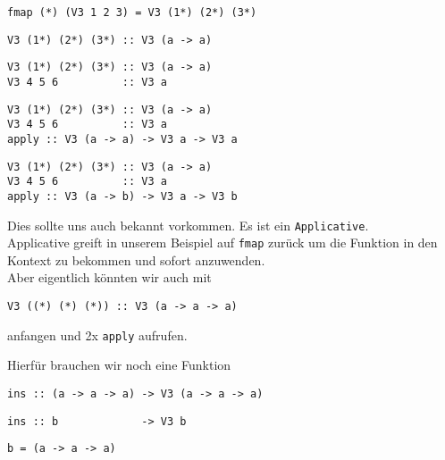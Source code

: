 \documentclass{beamer}
\begin{document}
\begin{frame}[fragile]
\begin{overprint}
\begin{verbatim}
fmap (*) (V3 1 2 3) = V3 (1*) (2*) (3*)
\end{verbatim}
\begin{verbatim}
V3 (1*) (2*) (3*) :: V3 (a -> a)
\end{verbatim}
\begin{verbatim}
V3 (1*) (2*) (3*) :: V3 (a -> a)
V3 4 5 6          :: V3 a
\end{verbatim}
\begin{verbatim}
V3 (1*) (2*) (3*) :: V3 (a -> a)
V3 4 5 6          :: V3 a
apply :: V3 (a -> a) -> V3 a -> V3 a
\end{verbatim}
\begin{verbatim}
V3 (1*) (2*) (3*) :: V3 (a -> a)
V3 4 5 6          :: V3 a
apply :: V3 (a -> b) -> V3 a -> V3 b
\end{verbatim}
\end{overprint}
\pause
\pause
\pause
\pause
\pause
Dies sollte uns auch bekannt vorkommen. \pause Es ist ein \texttt{Applicative}.\pause \\\bigskip
Applicative greift in unserem Beispiel auf \texttt{fmap} zurück um die Funktion in den Kontext zu bekommen und sofort anzuwenden.\\\pause
Aber eigentlich könnten wir auch mit
\begin{verbatim}
V3 ((*) (*) (*)) :: V3 (a -> a -> a)
\end{verbatim}
anfangen und 2x \texttt{apply} aufrufen.\\\par
\pause
Hierfür brauchen wir noch eine Funktion
\begin{overprint}
\begin{verbatim}
ins :: (a -> a -> a) -> V3 (a -> a -> a)
\end{verbatim}
\begin{verbatim}
ins :: b             -> V3 b
\end{verbatim}
\texttt{b = (a -> a -> a)}
\end{overprint}
\end{frame}
\end{document}
